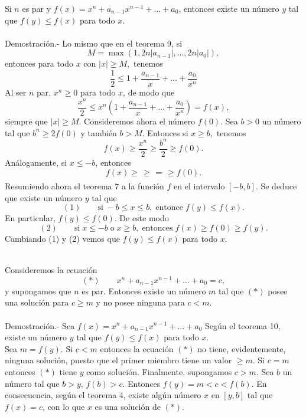 \begin{teo}
    Si $n$ es par y $f(x)=x^n + a_{n-1} x^{n-1} + \ldots + a_0$, entonces existe un número $y$ tal que $f(y)\leq f(x)$ para todo $x$.\\\\
	Demostración.-\; Lo mismo que en el teorema 9, si 
	$$M = \max(1,2n|a_{n-1}|,\ldots , 2n|a_0|),$$
	entonces para todo $x$ con $|x|\geq M,$ tenemos
	$$\dfrac{1}{2}\leq 1 + \dfrac{a_{n-1}}{x}+\ldots + \dfrac{a_0}{x^n}$$
	Al ser $n$ par, $x^n \geq 0$ para todo $x$, de modo que 
	$$\dfrac{x^n}{2}\leq x^n \left(1+\dfrac{a_{n-1}}{x} + \ldots + \dfrac{a_0}{x^n}\right) = f(x),$$
	siempre que $|x|\geq M$. Consideremos ahora el número $f(0)$. Sea $b>0$ un número tal que $b^n \geq 2f(0)$ y también $b>M$. Entonces si $x\geq b,$ tenemos 
	$$f(x)\geq \dfrac{x^n}{2}\geq \dfrac{b^n}{2}\geq f(0).$$
	Análogamente, si $x\leq -b$, entonces
	$$f(x)\geq \dfrac{}{}\geq \dfrac{}{} = \dfrac{}{}\geq f(0).$$
	Resumiendo ahora el teorema 7 a la función $f$ en el intervalo $[-b,b]$. Se deduce que existe un número $y$ tal que
	$$(1)\qquad \mbox{si}\; -b\leq x\leq b, \; \mbox{entonce}\; f(y)\leq f(x).$$
	En particular, $f(y)\leq f(0).$ De este modo
	$$(2)\qquad \mbox{si}\; x\leq -b \; \mbox{o}\; x\geq b,\; \mbox{entonces}\; f(x)\geq f(0)\geq f(y).$$
	Cambiando (1) y (2) vemos que $f(y)\leq f(x)$ para todo $x$.\\\\
\end{teo}

\begin{teo}
    Consideremos la ecuación
    $$(*)\qquad x^n + a_{n-1}x^{n-1}+ \ldots + a_0 = c,$$
    y supongamos que $n$ es par. Entonces existe un número $m$ tal que $(*)$ posee una solución para $c\geq m$ y no posee ninguna para $c<m.$\\\\
    Demostración.-\; Sea $f(x) = x^n + a_{n-1}x^{n-1}+\ldots + a_0$
    Según el teorema 10, existe un número $y$ tal que $f(y)\leq f(x)$ para todo $x$.\\
    Sea $m=f(y)$. Si $c<m$ entonces la ecuación $(*)$ no tiene, evidentemente, ninguna solución, puesto que el primer miembro tiene un valor $\geq m$. Si $c=m$ entonces $(*)$ tiene $y$ como solución. Finalmente, supongamos $c>m$. Sea $b$ un número tal que $b>y$, $f(b)>c$. Entonces $f(y)=m<c<f(b)$. En consecuencia, según el teorema 4, existe algún número $x$ en $[y,b]$ tal que $f(x)=c$, con lo que $x$ es una solución de $(*).$\\\\
\end{teo}





